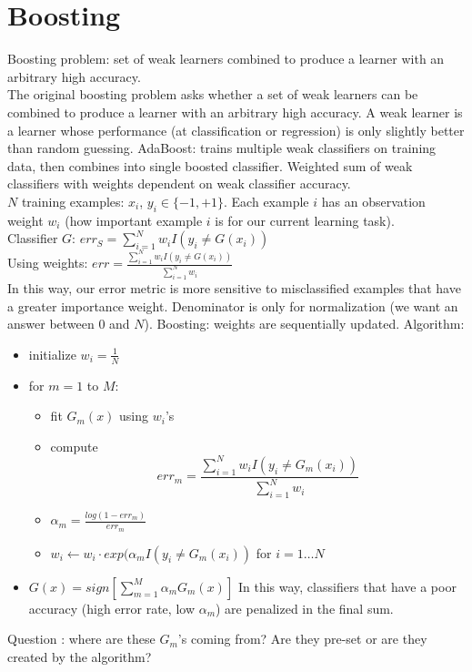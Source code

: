 \documentclass[titlepage,11pt]{article}
\begin{document}
\section{Boosting}
Boosting problem: set of weak learners combined to produce a learner with an arbitrary high accuracy.\\
The original boosting problem asks whether a set
of weak learners can be combined to produce a learner with an arbitrary
high accuracy. A weak learner is a learner whose performance (at
classification or regression) is only slightly better than random guessing.
AdaBoost: trains multiple weak classifiers on training data, then combines into single boosted classifier. Weighted sum of weak classifiers with weights dependent on weak classifier accuracy.\\
$N$ training examples: $x_i$, $y_i \in \{-1, +1\}$. Each example $i$ has an observation weight $w_i$ (how important example $i$ is for our current learning task).\\
Classifier $G$: $err_S = \sum_{i=1}^N{w_i I(y_i \neq G(x_i))}$ \\
Using weights: $err = \frac{\sum_{i=1}^N{w_i I(y_i \neq G(x_i))}}{\sum_{i=1}^N w_i}$\\
In this way, our error metric is more sensitive to misclassified examples
that have a greater importance weight. Denominator is only for normalization (we want an answer between 0 and $N$).
Boosting: weights are sequentially updated. Algorithm:\\
\begin{itemize}
\item initialize $w_i = \frac1N$
\item for $m =1$ to $M$:
\begin{itemize}
\item fit $G_m(x)$ using $w_i$'s
\item compute $$err_m = \frac{\sum_{i=1}^N{w_i I(y_i \neq G_m(x_i))}}{\sum_{i=1}^N w_i}$$
\item $\alpha_m = \frac{log(1-err_m)}{err_m}$
\item $w_i \leftarrow w_i \cdot exp(\alpha_m I(y_i \neq G_m(x_i))$ for $i = 1 \dots N$
\end{itemize}
\item $G(x) = sign [ \sum_{m=1}^M \alpha_m G_m(x)]$ In this way, classifiers that have a poor accuracy (high error rate, low $\alpha_m$) are penalized in the final sum.
\end{itemize}

Question : where are these $G_m$'s coming from? Are they pre-set or are they created by the algorithm?
\end{document}
